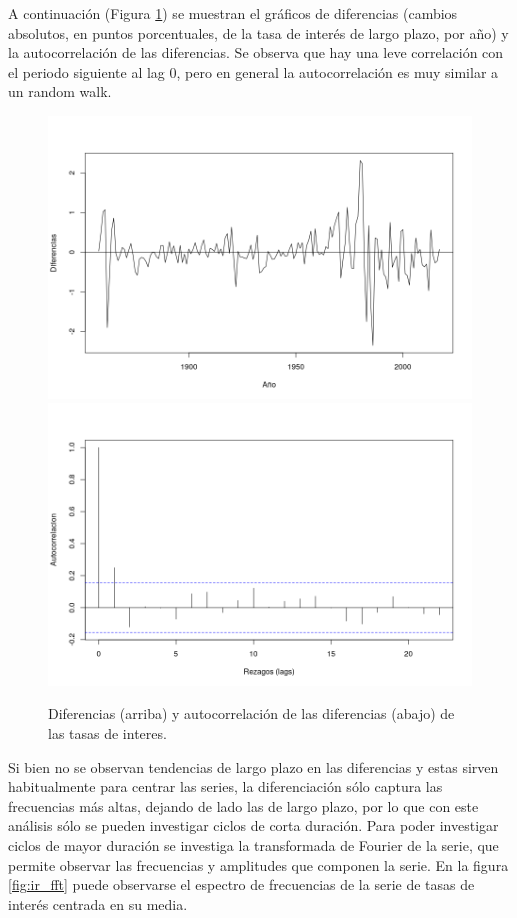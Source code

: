 \documentclass[a4paper]{article}
\begin{document}
A continuación (Figura \ref{fig:ir_diff_acf}) se muestran el gráficos de diferencias (cambios absolutos, en puntos porcentuales, de la tasa de interés de largo plazo, por año) y la autocorrelación de las diferencias. Se observa que hay una leve correlación con el periodo siguiente al lag 0, pero en general la autocorrelación es muy similar a un random walk.

\begin{figure}[H]
	\centering
	\includegraphics[width=0.75\linewidth]{ir_diff.png}
	\includegraphics[width=0.75\linewidth]{ir_diff_acf.png}
	\caption{Diferencias (arriba) y autocorrelación de las diferencias (abajo) de las tasas de interes.} 	
	\label{fig:ir_diff_acf}
\end{figure}

Si bien no se observan tendencias de largo plazo en las diferencias y estas sirven habitualmente para centrar las series, la diferenciación sólo captura las frecuencias más altas, dejando de lado las de largo plazo, por lo que con este análisis sólo se pueden investigar ciclos de corta duración. Para poder investigar ciclos de mayor duración se investiga la transformada de Fourier de la serie, que permite observar las frecuencias y amplitudes que componen la serie. En la figura \ref{fig:ir_fft} puede observarse el espectro de frecuencias de la serie de tasas de interés centrada en su media.
\end{document}

